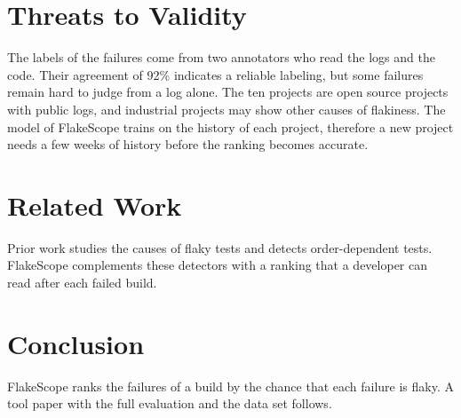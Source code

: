 \section{Threats to Validity}
The labels of the failures come from two annotators who read the logs and the code. Their agreement of 92\%
indicates a reliable labeling, but some failures remain hard to judge from a log alone. The ten projects are open
source projects with public logs, and industrial projects may show other causes of flakiness. The model of
FlakeScope trains on the history of each project, therefore a new project needs a few weeks of history before
the ranking becomes accurate.

\section{Related Work}
Prior work studies the causes of flaky tests and detects order-dependent tests. FlakeScope complements these
detectors with a ranking that a developer can read after each failed build.

\section{Conclusion}
FlakeScope ranks the failures of a build by the chance that each failure is flaky. A tool paper with the full
evaluation and the data set follows.
